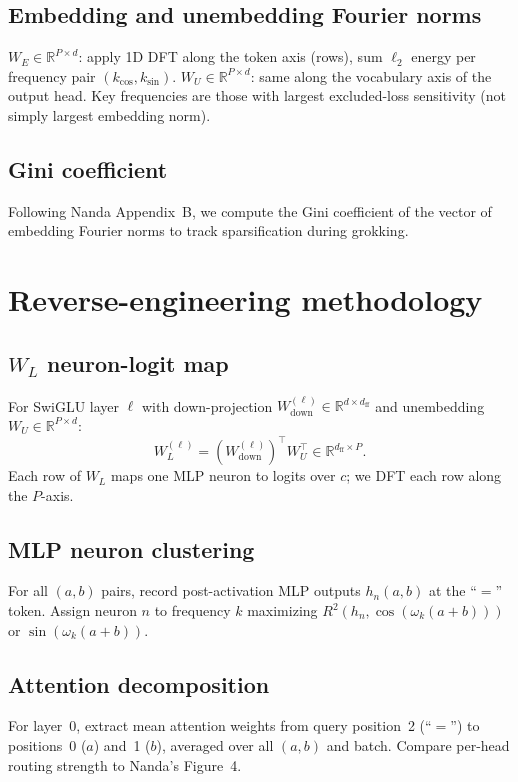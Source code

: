 \subsection{Embedding and unembedding Fourier norms}
$W_E \in \mathbb{R}^{P \times d}$: apply 1D DFT along the token axis (rows), sum $\ell_2$ energy per frequency pair $(k_{\cos}, k_{\sin})$.
$W_U \in \mathbb{R}^{P \times d}$: same along the vocabulary axis of the output head.
Key frequencies are those with largest excluded-loss sensitivity (not simply largest embedding norm).

\subsection{Gini coefficient}
Following Nanda Appendix~B, we compute the Gini coefficient of the vector of embedding Fourier norms to track sparsification during grokking.

\section{Reverse-engineering methodology}
\label{app:reverse_methods}

\subsection{$W_L$ neuron-logit map}
For SwiGLU layer $\ell$ with down-projection $W_{\mathrm{down}}^{(\ell)} \in \mathbb{R}^{d \times d_{\mathrm{ff}}}$ and unembedding $W_U \in \mathbb{R}^{P \times d}$:
\begin{equation}
  W_L^{(\ell)} = (W_{\mathrm{down}}^{(\ell)})^\top W_U^\top \in \mathbb{R}^{d_{\mathrm{ff}} \times P}.
\end{equation}
Each row of $W_L$ maps one MLP neuron to logits over $c$; we DFT each row along the $P$-axis.

\subsection{MLP neuron clustering}
For all $(a,b)$ pairs, record post-activation MLP outputs $h_n(a,b)$ at the ``$=$'' token.
Assign neuron $n$ to frequency $k$ maximizing $R^2(h_n, \cos(\omega_k(a+b)))$ or $\sin(\omega_k(a+b))$.

\subsection{Attention decomposition}
For layer~0, extract mean attention weights from query position~2 (``$=$'') to positions~0 ($a$) and~1 ($b$), averaged over all $(a,b)$ and batch.
Compare per-head routing strength to Nanda's Figure~4.

